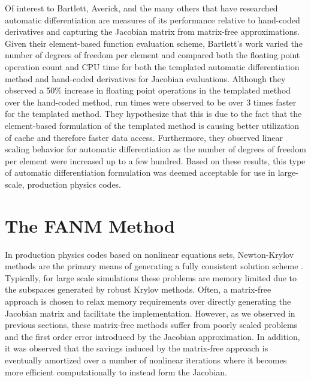 Of interest to Bartlett, Averick, and the many others that have
researched automatic differentiation are measures of its performance
relative to hand-coded derivatives and capturing the Jacobian matrix
from matrix-free approximations. Given their element-based function
evaluation scheme, Bartlett's work varied the number of degrees of
freedom per element and compared both the floating point operation
count and CPU time for both the templated automatic differentiation
method and hand-coded derivatives for Jacobian evaluations. Although
they observed a 50\% increase in floating point operations in the
templated method over the hand-coded method, run times were observed
to be over 3 times faster for the templated method. They hypothesize
that this is due to the fact that the element-based formulation of the
templated method is causing better utilization of cache and therefore
faster data access. Furthermore, they observed linear scaling behavior
for automatic differentiation as the number of degrees of freedom per
element were increased up to a few hundred. Based on these results,
this type of automatic differentiation formulation was deemed
acceptable for use in large-scale, production physics codes.

\section{The FANM Method}
\label{sec:fanm}
In production physics codes based on nonlinear equations sets,
Newton-Krylov methods are the primary means of generating a fully
consistent solution scheme
\citep{evans_development_2006,evans_enhanced_2007,gaston_parallel_2009,godoy_parallel_2012}. Typically,
for large scale simulations these problems are memory limited due to
the subspaces generated by robust Krylov methods. Often, a matrix-free
approach is chosen to relax memory requirements over directly
generating the Jacobian matrix and facilitate the
implementation. However, as we observed in previous sections, these
matrix-free methods suffer from poorly scaled problems and the first
order error introduced by the Jacobian approximation. In addition, it
was observed that the savings induced by the matrix-free approach is
eventually amortized over a number of nonlinear iterations where it
becomes more efficient computationally to instead form the Jacobian.


